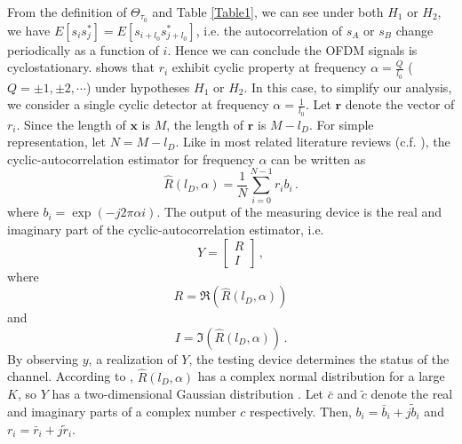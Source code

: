 From the definition of $\Theta_{\tau_0}$ and Table \ref{Table1}, we can see under both $H_1$ or $H_2$, we have $E[s_is_j^\ast] = E[s_{i+l_0}s_{j+l_0}^\ast]$, i.e. the autocorrelation of $s_A$ or $s_B$ change periodically as a function of $i$. Hence we can conclude the OFDM signals is cyclostationary.  
\cite{lunden2007spectrum} shows that $r_i$ exhibit cyclic property at frequency $\alpha = \frac{Q}{l_0}$ ($Q = \pm1, \pm2, \cdots$) under hypotheses $H_1$ or $H_2$. In this case, to simplify our analysis, we consider a single cyclic detector at frequency $\alpha = \frac{1}{l_0}$. 
Let $\mathbf{r}$ denote the vector of $r_i$. Since the length of $\mathbf{x}$ is $M$, the length of $\mathbf{r}$ is $M - l_D$. For simple representation, let $N = M - l_D$.
Like in most related literature reviews (c.f. \cite{lunden2010robust} \cite{dandawate1994statistical}), the cyclic-autocorrelation estimator for frequency $\alpha$ can be written as
\begin{equation}
  \hat{R}(l_D, \alpha) = \frac{1}{N}\sum_{i=0}^{N-1} r_ib_i\,.
  \label{cyclicR}
\end{equation}
where $b_i = \exp(-j2\pi\alpha i)$. 
The output of the measuring device is the real and imaginary part of the cyclic-autocorrelation estimator, i.e. 
\begin{equation}
  Y = \begin{bmatrix}
	R \\
	I
  \end{bmatrix}\,,
  \label{cyclic_cov}
\end{equation}
where 
\[
  R = \Re(\hat{R}(l_D, \alpha))
\]
and 
\[
  I = \Im(\hat{R}(l_D, \alpha))\,.
\]
By observing $y$, a realization  of $Y$, the testing device determines the status of the channel.
According to \cite{lunden2010robust}, $\hat{R}(l_D, \alpha)$ has a complex normal distribution for a large $K$, so $Y$ has a two-dimensional Gaussian distribution \cite{goodman1963statistical}.
Let $\bar{c}$ and $\tilde{c}$ denote the real and imaginary parts of a complex number $c$ respectively. Then, $b_i = \bar{b}_i + j\tilde{b}_i$  and $r_i = \bar{r}_i + j\tilde{r}_i$. 


